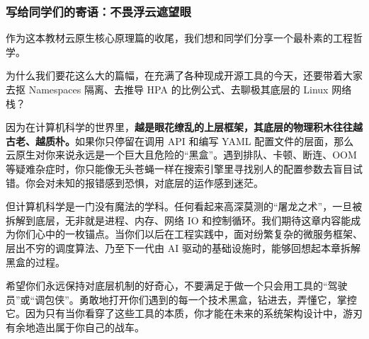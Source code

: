 \subsubsection{写给同学们的寄语：不畏浮云遮望眼}

作为这本教材云原生核心原理篇的收尾，我们想和同学们分享一个最朴素的工程哲学。

为什么我们要花这么大的篇幅，在充满了各种现成开源工具的今天，还要带着大家去抠 Namespaces 隔离、去推导 HPA 的比例公式、去聊极其底层的 Linux 网络栈？

因为在计算机科学的世界里，\textbf{越是眼花缭乱的上层框架，其底层的物理积木往往越古老、越质朴。}如果你只停留在调用 API 和编写 YAML 配置文件的层面，那么云原生对你来说永远是一个巨大且危险的“黑盒”。遇到排队、卡顿、断连、OOM 等疑难杂症时，你只能像无头苍蝇一样在搜索引擎里寻找别人的配置参数去盲目试错。你会对未知的报错感到恐惧，对底层的运作感到迷茫。

但计算机科学是一门没有魔法的学科。任何看起来高深莫测的“屠龙之术”，一旦被拆解到底层，无非就是进程、内存、网络 IO 和控制循环。我们期待这章内容能成为你们心中的一枚锚点。当你们以后在工程实践中，面对纷繁复杂的微服务框架、层出不穷的调度算法、乃至下一代由 AI 驱动的基础设施时，能够回想起本章拆解黑盒的过程。

希望你们永远保持对底层机制的好奇心，不要满足于做一个只会用工具的“驾驶员”或“调包侠”。勇敢地打开你们遇到的每一个技术黑盒，钻进去，弄懂它，掌控它。因为只有当你看穿了这些工具的本质，你才能在未来的系统架构设计中，游刃有余地造出属于你自己的战车。

\newpage